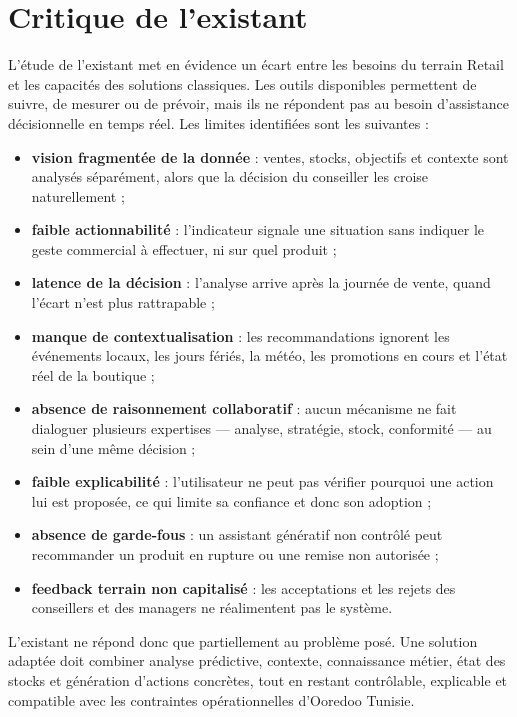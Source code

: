 \section{Critique de l'existant}

L'étude de l'existant met en évidence un écart entre les besoins du terrain Retail et les capacités des solutions classiques. Les outils disponibles permettent de suivre, de mesurer ou de prévoir, mais ils ne répondent pas au besoin d'assistance décisionnelle en temps réel. Les limites identifiées sont les suivantes :

\begin{itemize}[label=--]
    \item \textbf{vision fragmentée de la donnée} : ventes, stocks, objectifs et contexte sont analysés séparément, alors que la décision du conseiller les croise naturellement ;
    \item \textbf{faible actionnabilité} : l'indicateur signale une situation sans indiquer le geste commercial à effectuer, ni sur quel produit ;
    \item \textbf{latence de la décision} : l'analyse arrive après la journée de vente, quand l'écart n'est plus rattrapable ;
    \item \textbf{manque de contextualisation} : les recommandations ignorent les événements locaux, les jours fériés, la météo, les promotions en cours et l'état réel de la boutique ;
    \item \textbf{absence de raisonnement collaboratif} : aucun mécanisme ne fait dialoguer plusieurs expertises — analyse, stratégie, stock, conformité — au sein d'une même décision ;
    \item \textbf{faible explicabilité} : l'utilisateur ne peut pas vérifier pourquoi une action lui est proposée, ce qui limite sa confiance et donc son adoption ;
    \item \textbf{absence de garde-fous} : un assistant génératif non contrôlé peut recommander un produit en rupture ou une remise non autorisée ;
    \item \textbf{feedback terrain non capitalisé} : les acceptations et les rejets des conseillers et des managers ne réalimentent pas le système.
\end{itemize}

L'existant ne répond donc que partiellement au problème posé. Une solution adaptée doit combiner analyse prédictive, contexte, connaissance métier, état des stocks et génération d'actions concrètes, tout en restant contrôlable, explicable et compatible avec les contraintes opérationnelles d'Ooredoo Tunisie.

